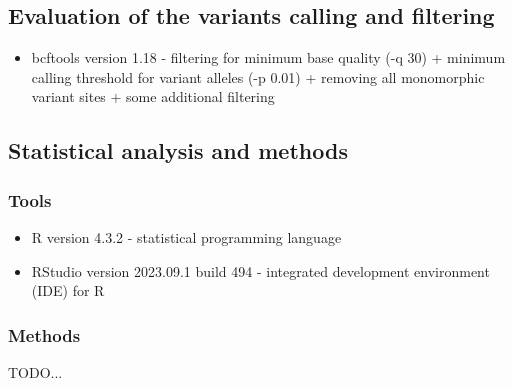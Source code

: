 \subsection{Evaluation of the variants calling and filtering}

\begin{itemize}
    \item bcftools version 1.18 - filtering for minimum base quality (-q 30) + minimum calling threshold for variant alleles (-p 0.01) + removing all monomorphic variant sites + some additional filtering
\end{itemize}

\subsection{Statistical analysis and methods}

\subsubsection{Tools}

\begin{itemize}
    \item R version 4.3.2 - statistical programming language
    \item RStudio version 2023.09.1 build 494 - integrated development environment (IDE) for R
\end{itemize}

\subsubsection{Methods}

TODO...